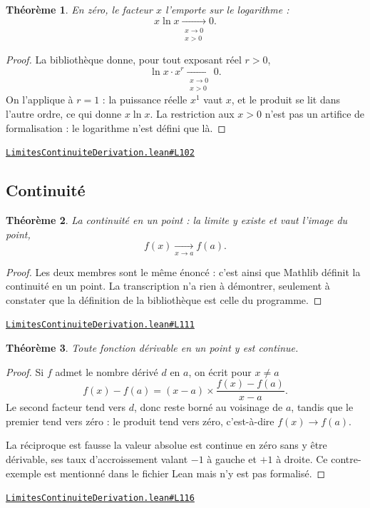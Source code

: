 \documentclass[11pt,a4paper]{article}
\theoremstyle{definition}
\theoremstyle{plain}
\newtheorem{theoreme}{Théorème}
\newcommand{\source}[2]{\par\smallskip\noindent\hfill{\footnotesize\href{#1}{\texttt{#2}}}\par\smallskip}
\begin{document}
\begin{theoreme}
En zéro, le facteur $x$ l'emporte sur le logarithme :
\[ x \ln x \xrightarrow[\substack{x \to 0 \\ x > 0}]{} 0 . \]
\end{theoreme}

\begin{proof}
La bibliothèque donne, pour tout exposant réel $r > 0$,
\[ \ln x \cdot x^{r} \xrightarrow[\substack{x \to 0 \\ x > 0}]{} 0 . \]
On l'applique à $r = 1$ : la puissance réelle $x^{1}$ vaut $x$, et le produit se lit dans
l'autre ordre, ce qui donne $x \ln x$. La restriction aux $x > 0$ n'est pas un artifice de
formalisation : le logarithme n'est défini que là.
\end{proof}
\source{https://github.com/Commutator-IO/learn-lean/blob/main/cours/02-lycee/04-limites-continuite-derivation/LimitesContinuiteDerivation.lean\#L102}{LimitesContinuiteDerivation.lean\#L102}

\subsection{Continuité}

\begin{theoreme}
La continuité en un point : la limite y existe et vaut l'image du point,
\[ f(x) \xrightarrow[x \to a]{} f(a) . \]
\end{theoreme}

\begin{proof}
Les deux membres sont le même énoncé : c'est ainsi que Mathlib définit la continuité en un
point. La transcription n'a rien à démontrer, seulement à constater que la définition de la
bibliothèque est celle du programme.
\end{proof}
\source{https://github.com/Commutator-IO/learn-lean/blob/main/cours/02-lycee/04-limites-continuite-derivation/LimitesContinuiteDerivation.lean\#L111}{LimitesContinuiteDerivation.lean\#L111}

\begin{theoreme}
Toute fonction dérivable en un point y est continue.
\end{theoreme}

\begin{proof}
Si $f$ admet le nombre dérivé $d$ en $a$, on écrit pour $x \ne a$
\[ f(x) - f(a) = (x - a) \times \frac{f(x) - f(a)}{x - a} . \]
Le second facteur tend vers $d$, donc reste borné au voisinage de $a$, tandis que le
premier tend vers zéro : le produit tend vers zéro, c'est-à-dire $f(x) \to f(a)$.

\medskip\noindent
La réciproque est fausse \textemdash{} la valeur absolue est continue en zéro sans y être
dérivable, ses taux d'accroissement valant $-1$ à gauche et $+1$ à droite. Ce
contre-exemple est mentionné dans le fichier Lean mais n'y est pas formalisé.
\end{proof}
\source{https://github.com/Commutator-IO/learn-lean/blob/main/cours/02-lycee/04-limites-continuite-derivation/LimitesContinuiteDerivation.lean\#L116}{LimitesContinuiteDerivation.lean\#L116}
\end{document}
